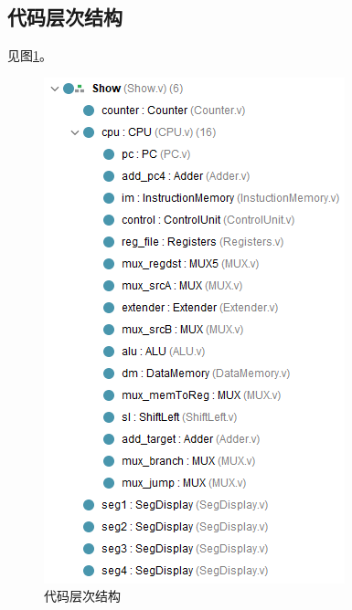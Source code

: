 \subsection{代码层次结构}
\qquad 见图\ref{fig:code_hierachy}。
\begin{figure}
\centering
\includegraphics[width=0.4\linewidth]{fig/code_hierachy.PNG}
\caption{代码层次结构}
\label{fig:code_hierachy}
\end{figure}